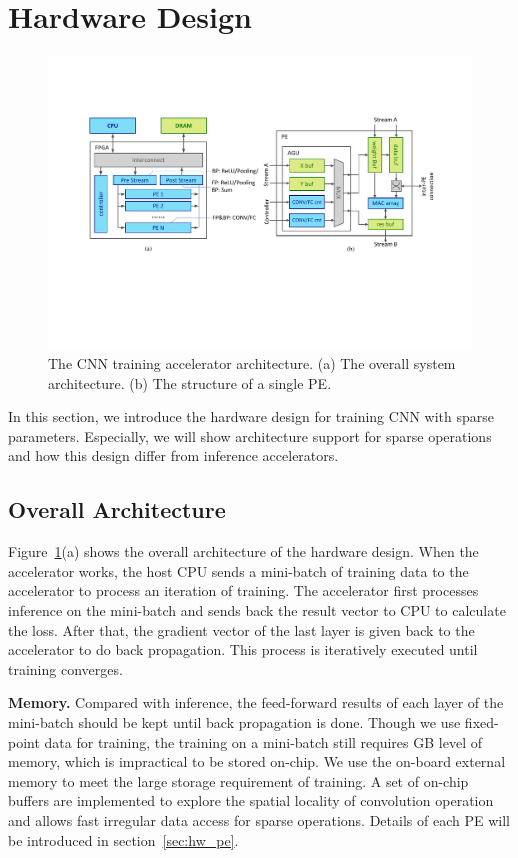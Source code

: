 \section{Hardware Design}\label{sec:hw}

\begin{figure}[htbp]
  \centering
  \includegraphics[width=2\columnwidth]{figures/hardware.pdf}
  \caption{The CNN training accelerator architecture. (a) The overall system architecture. (b) The structure of a single PE. }
  \label{fig:arch}
\end{figure}

In this section, we introduce the hardware design for training CNN with sparse parameters. Especially, we will show architecture support for sparse operations and how this design differ from inference accelerators.

\subsection{Overall Architecture}
Figure~\ref{fig:arch}(a) shows the overall architecture of the hardware design. When the accelerator works, the host CPU sends a mini-batch of training data to the accelerator to process an iteration of training. The accelerator first processes inference on the mini-batch and sends back the result vector to CPU to calculate the loss. After that, the gradient vector of the last layer is given back to the accelerator to do back propagation. This process is iteratively executed until training converges.

{\bf Memory.} Compared with inference, the feed-forward results of each layer of the mini-batch should be kept until back propagation is done. Though we use fixed-point data for training, the training on a mini-batch still requires GB level of memory, which is impractical to be stored on-chip. We use the on-board external memory to meet the large storage requirement of training. A set of on-chip buffers are implemented to explore the spatial locality of convolution operation and allows fast irregular data access for sparse operations. Details of each PE will be introduced in section~\ref{sec:hw_pe}.

